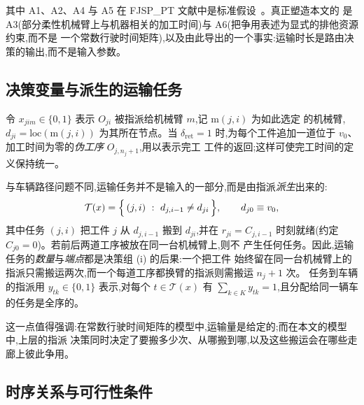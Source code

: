 \documentclass[manuscript,screen,review]{acmart}
\begin{document}
其中 A1、A2、A4 与 A5 在 FJSP\_PT 文献中是标准假设~\cite{xin2025review}。真正塑造本文的
是 A3(部分柔性机械臂上与机器相关的加工时间)与 A6(把争用表述为显式的排他资源约束,而不是
一个常数行驶时间矩阵),以及由此导出的一个事实:运输时长是路由决策的输出,而不是输入参数。

\subsection{决策变量与派生的运输任务}

令 $x_{jim}\in\{0,1\}$ 表示 $O_{ji}$ 被指派给机械臂 $m$,记 $\mathrm{m}(j,i)$ 为如此选定
的机械臂,$d_{ji}=\mathrm{loc}(\mathrm{m}(j,i))$ 为其所在节点。当 $\delta_{\mathrm{ret}}=1$
时,为每个工件追加一道位于 $v_0$、加工时间为零的\emph{伪工序} $O_{j,n_j+1}$,用以表示完工
工件的返回;这样可使完工时间的定义保持统一。

与车辆路径问题不同,运输任务并不是输入的一部分,而是由指派\emph{派生}出来的:
\begin{equation}
\label{eq:tasks}
\mathcal{T}(x)=\Bigl\{\,(j,i)\ :\ d_{j,i-1}\neq d_{ji}\,\Bigr\},
\qquad d_{j0}\equiv v_0 ,
\end{equation}
其中任务 $(j,i)$ 把工件 $j$ 从 $d_{j,i-1}$ 搬到 $d_{ji}$,并在
$r_{ji}=C_{j,i-1}$ 时刻就绪(约定 $C_{j0}=0$)。若前后两道工序被放在同一台机械臂上,则不
产生任何任务。因此,运输任务的\emph{数量}与\emph{端点}都是决策组 (i) 的后果:一个把工件
始终留在同一台机械臂上的指派只需搬运两次,而一个每道工序都换臂的指派则需搬运 $n_j+1$ 次。
任务到车辆的指派用 $y_{tk}\in\{0,1\}$ 表示,对每个 $t\in\mathcal{T}(x)$ 有
$\sum_{k\in K}y_{tk}=1$,且分配给同一辆车的任务是全序的。

这一点值得强调:在常数行驶时间矩阵的模型中,运输量是给定的;而在本文的模型中,上层的指派
决策同时决定了要搬多少次、从哪搬到哪,以及这些搬运会在哪些走廊上彼此争用。

\subsection{时序关系与可行性条件}
\end{document}
